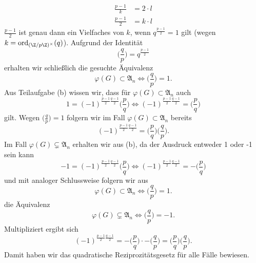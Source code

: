 \documentclass{article}
\newcommand{\ord}{\operatorname{ord}}
\begin{document}
\begin{enumerate}[(a)]
\begin{align*}
            \frac{p-1}{k} &= 2 \cdot l\\
            \frac{p-1}{2} &= k \cdot l
        \end{align*}
        $\frac{p-1}{2}$ ist genau dann ein Vielfaches von $k$, wenn $q^\frac{p-1}{2} = 1$ gilt (wegen $k = \ord_{(\Z/p\Z)^\times}(q)$). Aufgrund der Identität
        \[
            \biggl(\frac{q}{p}\biggr) = q^\frac{p-1}{2}
        \]
        erhalten wir schließlich die gesuchte Äquivalenz
        \[
            \varphi(G) \subset \mathfrak{A}_n \Leftrightarrow \biggl(\frac{q}{p}\biggr) = 1.
        \]
        Aus Teilaufgabe (b) wissen wir, dass für $\varphi(G)\subset \mathfrak{A}_n$ auch
        \[
            1 = (-1)^{\frac{p-1}{2} \frac{q-1}{2}}\biggl(\frac{p}{q}\biggr) \Leftrightarrow (-1)^{\frac{p-1}{2}\frac{q-1}{2}} =  \biggl(\frac{p}{q}\biggr)
        \]
        gilt. Wegen $\biggl(\frac{q}{p}\biggr) = 1$ folgern wir im Fall $\varphi(G)\subset \mathfrak{A}_n$ bereits
        \[
            (-1)^{\frac{p-1}{2}\frac{q-1}{2}} =  \biggl(\frac{p}{q}\biggr)\biggl(\frac{q}{p}\biggr).
        \]
        Im Fall $\varphi(G) \subsetneq \mathfrak{A}_n$ erhalten wir aus (b), da der Ausdruck entweder 1 oder -1 sein kann
        \[
            -1 = (-1)^{\frac{p-1}{2} \frac{q-1}{2}}\biggl(\frac{p}{q}\biggr) \Leftrightarrow (-1)^{\frac{p-1}{2}\frac{q-1}{2}} = -\biggl(\frac{p}{q}\biggr)
        \]
        und mit analoger Schlussweise folgern wir aus
        \[
            \varphi(G) \subset \mathfrak{A}_n \Leftrightarrow \biggl(\frac{q}{p}\biggr) = 1.
        \]
        die Äquivalenz
        \[
            \varphi(G) \subsetneq \mathfrak{A}_n \Leftrightarrow \biggl(\frac{q}{p}\biggr) = -1.
        \]
        Multipliziert ergibt sich 
        \[
            (-1)^{\frac{p-1}{2}\frac{q-1}{2}} =  -\biggl(\frac{p}{q}\biggr)\cdot -\biggl(\frac{q}{p}\biggr) = \biggl(\frac{p}{q}\biggr)\biggl(\frac{q}{p}\biggr).
        \]
        Damit haben wir das quadratische Reziprozitätsgesetz für alle Fälle bewiesen.
    \end{enumerate}
\end{document}
